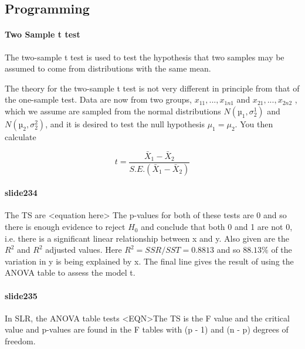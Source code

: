 \documentclass[a4paper,12pt]{article}
\begin{document}
\begin{itemize}
\begin{itemize}
		\newpage
		\chapter{Programming}
		
		
		
		
		
		
		
		\subsubsection{Two Sample t test}
		
		The two-sample t test is used to test the hypothesis that two samples may
		be assumed to come from distributions with the same mean.
		
		The theory for the two-sample t test is not very different in principle from
		that of the one-sample test. Data are now from two groups, $x_{11}, . . . , x_{1n1}$
		and $x_{21}, . . . , x_{2n2}$ , which we assume are sampled from the normal distributions
		$N(µ_{1}, \sigma^{1}_{2} )$ and
		$N(µ_{2}, \sigma^{2}_{2} )$, and it is desired to test the null hypothesis
		$\mu_{1} = \mu_{2}$. You then calculate
		
		\[
		t = \frac{\bar{X}_{1}-\bar{X}_{2}}{S.E.(\bar{X}_{1}-\bar{X}_{2})}
		\]
		
		
		
		
		\subsubsection{slide234}
		The TS are <equation here>  
		The p-values for both of these tests are 0 and so there is enough evidence to reject $H_0$ and conclude that both 0 and 1 are not 0, i.e. there is a significant linear relationship between x and y. 
		Also given are the $R^2$ and $R^2$ adjusted values. Here $R^2 = SSR/SST = 0.8813$ and so $88.13\%$ of the variation in y is being explained by x. 
		The final line gives the result of using the ANOVA table to assess the model t.
		
		
		\subsubsection{slide235}
		
		In SLR, the ANOVA table tests <EQN>The TS is the F value and the critical value and p-values are found
		in the F tables with (p - 1) and (n - p) degrees of freedom.
		

\end{itemize}
\end{itemize}
\end{document}
